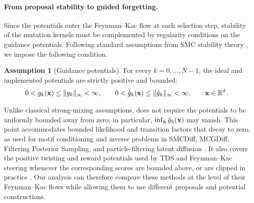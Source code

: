 \documentclass[11pt]{article}
\theoremstyle{plain}
\theoremstyle{definition}
\newtheorem{assumption}[theorem]{Assumption}
\theoremstyle{remark}
\begin{document}
\paragraph{From proposal stability to guided forgetting.}
Since the potentials enter the Feynman--Kac flow at each selection step, stability of the mutation kernels must be complemented by regularity conditions on the guidance potentials. Following standard assumptions from SMC stability theory \citep{delmoral2004feynman,whiteley2012sequential,douc2014longterm}, we impose the following condition.

\begin{assumption}[Guidance potentials]
\label{ass:bounded_normalized_potentials}
For every $k=0,\ldots,N-1$, the ideal and implemented potentials are
strictly positive and bounded:
$$
0<\pot{k}(\x)\le \|\pot{k}\|_\infty<\infty,
\qquad 0 <\approxpot{k}(\x)\le \|\approxpot{k}\|_\infty<\infty,
\qquad \x\in\rset^\xdim \eqsp.
$$
\end{assumption}
%
Unlike classical strong-mixing assumptions,  does not require
the potentials to be uniformly bounded away from zero; in particular,
$\inf_{\x}\approxpot{k}(\x)$ may vanish. This point accommodates bounded likelihood and transition factors that decay to zero, as used for motif conditioning and inverse problems in SMCDiff, MCGDiff, Filtering Posterior Sampling, and particle-filtering latent diffusion \citep{trippe2023diffusion,cardoso2024monte,dou2024diffusion,nazemi2024particle}. It also covers the positive twisting and reward potentials used by TDS and Feynman--Kac steering whenever the corresponding scores are bounded above, or are clipped in practice \citep{wu2023practical,singhal2025general}. Our analysis can therefore compare these methods at the level of their Feynman--Kac flows while allowing them to use different proposals and potential constructions.
\end{document}
